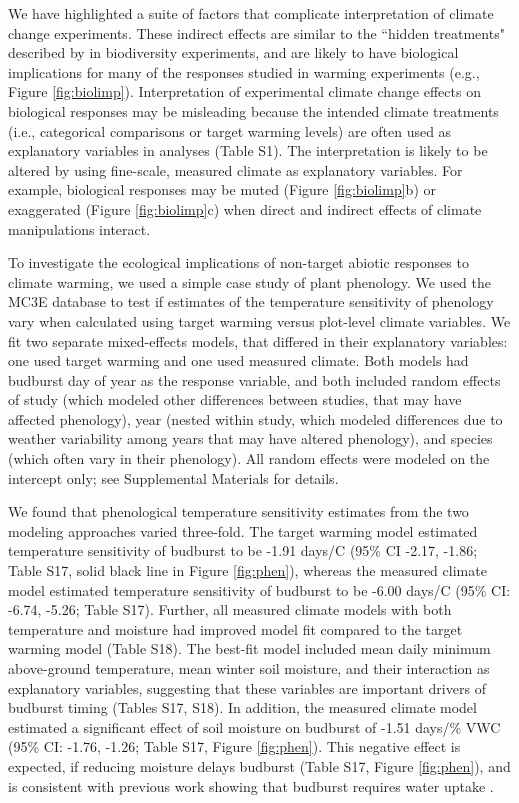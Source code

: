 \documentclass{article}
\begin{document}
\par We have highlighted a suite of factors that complicate interpretation of climate change experiments. These indirect effects are similar to the ``hidden treatments" described by \citet{huston1997} in biodiversity experiments, and are likely to have biological implications for many of the responses studied in warming experiments (e.g., Figure \ref{fig:biolimp}). Interpretation of experimental climate change effects on biological responses may be misleading because the intended climate treatments (i.e., categorical comparisons or target warming levels) are often used as explanatory variables in analyses (Table S1). The interpretation is likely to be altered by using fine-scale, measured climate as explanatory variables. For example, biological responses may be muted (Figure \ref{fig:biolimp}b) or exaggerated (Figure \ref{fig:biolimp}c) when direct and indirect effects of climate manipulations interact.

\par To investigate the ecological implications of non-target abiotic responses to climate warming, we used a simple case study of plant phenology. We used the MC3E database to test if estimates of the temperature sensitivity of phenology vary when calculated using target warming versus plot-level climate variables. We fit two separate mixed-effects models, that differed in their explanatory variables: one used target warming and one used measured climate. Both models had budburst day of year as the response variable, and both included random effects of study (which modeled other differences between studies, that may have affected phenology), year (nested within study, which modeled differences due to weather variability among years that may have altered phenology), and species (which often vary in their phenology).  All random effects were modeled on the intercept only; see Supplemental Materials for details.

\par We found that phenological temperature sensitivity estimates from the two modeling approaches varied three-fold. The target warming model estimated temperature sensitivity of budburst to be -1.91 days/\degree C (95\% CI -2.17, -1.86; Table S17, solid black line in Figure \ref{fig:phen}), whereas the measured climate model estimated temperature sensitivity of budburst to be -6.00 days/\degree C (95\% CI: -6.74, -5.26; Table S17). Further, all measured climate models with both temperature and moisture had improved model fit compared to the target warming model (Table S18). The best-fit model included mean daily minimum above-ground temperature, mean winter soil moisture, and their interaction as explanatory variables, suggesting that these variables are important drivers of budburst timing (Tables S17, S18). 
In addition, the measured climate model estimated a significant effect of soil moisture on budburst of -1.51 days/\% VWC (95\% CI: -1.76, -1.26; Table S17, Figure \ref{fig:phen}). This negative effect is expected, if reducing moisture delays budburst (Table S17, Figure \ref{fig:phen}), and is consistent with previous work showing that budburst requires water uptake \citep{essiamah1986}. 
\end{document}
